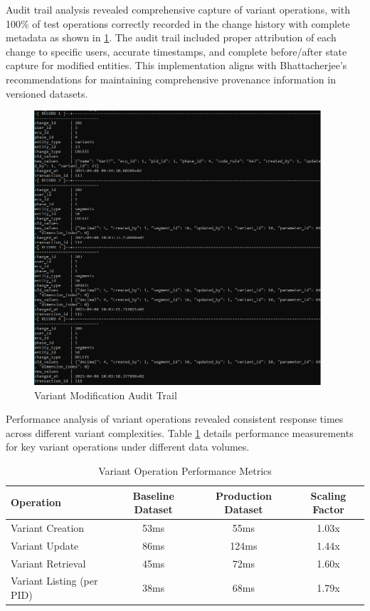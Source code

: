 Audit trail analysis revealed comprehensive capture of variant operations, with 100\% of test operations correctly recorded in the change history with complete metadata as shown in \ref{fig:variant-change-history}. The audit trail included proper attribution of each change to specific users, accurate timestamps, and complete before/after state capture for modified entities. This implementation aligns with Bhattacherjee's recommendations \cite{bhattacherjee2015principles} for maintaining comprehensive provenance information in versioned datasets.

\begin{figure}[h]
    \centering
    \includegraphics[width=0.95\textwidth]{figures/change_history_variants.png}
    \caption{Variant Modification Audit Trail}
    \label{fig:variant-change-history}
\end{figure}

Performance analysis of variant operations revealed consistent response times across different variant complexities. Table \ref{tab:variant-operation-performance} details performance measurements for key variant operations under different data volumes.

\begin{table}[h]
\centering
\caption{Variant Operation Performance Metrics}
\label{tab:variant-operation-performance}
\begin{tabular}{|l|c|c|c|}
\hline
\textbf{Operation} & \textbf{Baseline Dataset} & \textbf{Production Dataset} & \textbf{Scaling Factor} \\
\hline
Variant Creation & 53ms & 55ms & 1.03x \\
\hline
Variant Update & 86ms & 124ms & 1.44x \\
\hline
Variant Retrieval & 45ms & 72ms & 1.60x \\
\hline
Variant Listing (per PID) & 38ms & 68ms & 1.79x \\
\hline
\end{tabular}
\end{table}

